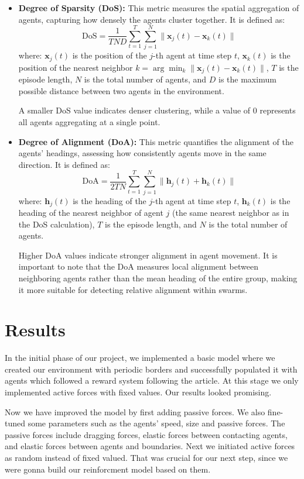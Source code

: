 \documentclass[9pt]{pnas-new}
\begin{document}
\begin{itemize}
    \item \textbf{Degree of Sparsity (DoS):} This metric measures the spatial aggregation of agents, capturing how densely the agents cluster together. It is defined as:
    \[
    \text{DoS} = \frac{1}{TND} \sum_{t=1}^T \sum_{j=1}^N \| \mathbf{x}_j(t) - \mathbf{x}_k(t) \|
    \]
    where: \( \mathbf{x}_j(t) \) is the position of the \(j\)-th agent at time step \(t\), \( \mathbf{x}_k(t) \) is the position of the nearest neighbor \(k = \arg\min_k \| \mathbf{x}_j(t) - \mathbf{x}_k(t) \| \), \(T\) is the episode length, \(N\) is the total number of agents, and \(D\) is the maximum possible distance between two agents in the environment.
    
    A smaller DoS value indicates denser clustering, while a value of 0 represents all agents aggregating at a single point.

    \item \textbf{Degree of Alignment (DoA):} This metric quantifies the alignment of the agents' headings, assessing how consistently agents move in the same direction. It is defined as:
    \[
    \text{DoA} = \frac{1}{2TN} \sum_{t=1}^T \sum_{j=1}^N \| \mathbf{h}_j(t) + \mathbf{h}_k(t) \|
    \]
    where: \( \mathbf{h}_j(t) \) is the heading of the \(j\)-th agent at time step \(t\), \( \mathbf{h}_k(t) \) is the heading of the nearest neighbor of agent \(j\) (the same nearest neighbor as in the DoS calculation), \(T\) is the episode length, and \(N\) is the total number of agents.
    
    Higher DoA values indicate stronger alignment in agent movement. It is important to note that the DoA measures local alignment between neighboring agents rather than the mean heading of the entire group, making it more suitable for detecting relative alignment within swarms.
\end{itemize}

\section*{Results}


In the initial phase of our project, we implemented a basic model where we created our environment with periodic borders and successfully populated it with agents which followed a reward system following the article. At this stage we only implemented active forces with fixed values. Our results looked promising.

Now we have improved the model by first adding passive forces. We also fine-tuned some parameters such as the agents' speed, size and passive forces. 
The passive forces include dragging forces, elastic forces between contacting agents, and elastic forces between agents and boundaries. 
Next we initiated active forces as random instead of fixed valued. That was crucial for our next step, since we were gonna build our reinforcment model based on them.
\end{document}

